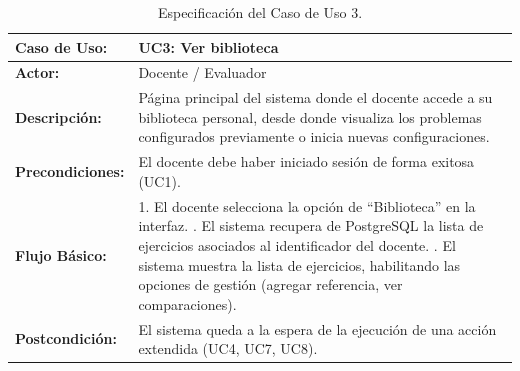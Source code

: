 \begin{table}[H]
	\centering
	\begin{tabular}{|p{3cm}|p{11cm}|}
		\hline
		\rowcolor[HTML]{E7F3FF}
		\textbf{Caso de Uso:}    & \textbf{UC3: Ver biblioteca}                                                                                                                                                 \\ \hline
		\textbf{Actor:}          & Docente / Evaluador                                                                                                                                                          \\ \hline
		\textbf{Descripción:}    & Página principal del sistema donde el docente accede a su biblioteca personal, desde donde visualiza los problemas configurados previamente o inicia nuevas configuraciones. \\ \hline
		\textbf{Precondiciones:} & El docente debe haber iniciado sesión de forma exitosa (UC1).                                                                                                                \\ \hline
		\textbf{Flujo Básico:}   &
		1. El docente selecciona la opción de ``Biblioteca'' en la interfaz. \newline
		2. El sistema recupera de PostgreSQL la lista de ejercicios asociados al identificador del docente. \newline
		3. El sistema muestra la lista de ejercicios, habilitando las opciones de gestión (agregar referencia, ver comparaciones).                                                                              \\ \hline
		\textbf{Postcondición:}  & El sistema queda a la espera de la ejecución de una acción extendida (UC4, UC7, UC8).                                                                                        \\ \hline
	\end{tabular}
	\caption{Especificación del Caso de Uso 3.}
\end{table}

